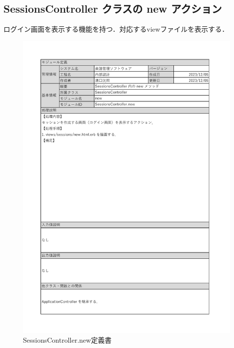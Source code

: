 \subsection*{SessionsController クラスの new アクション}
ログイン画面を表示する機能を持つ．対応するviewファイルを表示する．
\begin{figure}[H]
    \centering
    \includegraphics[scale=0.6]{img/Sessions/xlsx/SessionsController.new.pdf}
    \vspace{-1cm}
    \caption{SessionsController.new定義書}
\end{figure}
